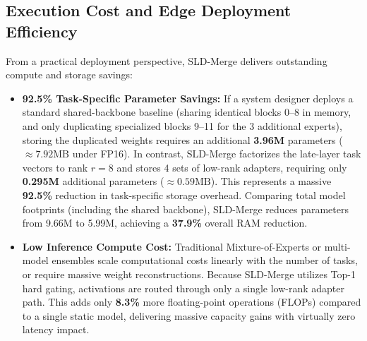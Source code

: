 \subsection{Execution Cost and Edge Deployment Efficiency}
From a practical deployment perspective, SLD-Merge delivers outstanding compute and storage savings:
\begin{itemize}
    \item \textbf{92.5\% Task-Specific Parameter Savings:} If a system designer deploys a standard shared-backbone baseline (sharing identical blocks 0--8 in memory, and only duplicating specialized blocks 9--11 for the 3 additional experts), storing the duplicated weights requires an additional \textbf{3.96M} parameters ($\approx 7.92\text{MB}$ under FP16). In contrast, SLD-Merge factorizes the late-layer task vectors to rank $r=8$ and stores 4 sets of low-rank adapters, requiring only \textbf{0.295M} additional parameters ($\approx 0.59\text{MB}$). This represents a massive \textbf{92.5\%} reduction in task-specific storage overhead. Comparing total model footprints (including the shared backbone), SLD-Merge reduces parameters from 9.66M to 5.99M, achieving a \textbf{37.9\%} overall RAM reduction.
    \item \textbf{Low Inference Compute Cost:} Traditional Mixture-of-Experts or multi-model ensembles scale computational costs linearly with the number of tasks, or require massive weight reconstructions. Because SLD-Merge utilizes Top-1 hard gating, activations are routed through only a single low-rank adapter path. This adds only \textbf{8.3\%} more floating-point operations (FLOPs) compared to a single static model, delivering massive capacity gains with virtually zero latency impact.
\end{itemize}
